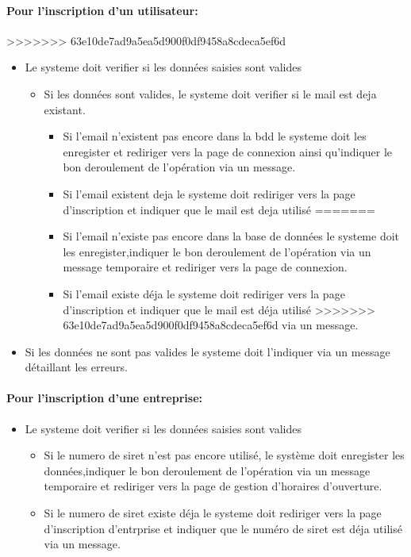 \documentclass{article}
\begin{document}
\begin{itemize}
\begin{itemize}
\paragraph{Pour l'inscription d'un utilisateur: }
>>>>>>> 63e10de7ad9a5ea5d900f0df9458a8cdeca5ef6d
\begin{itemize}
\item Le systeme doit verifier si les données saisies sont valides
	\begin{itemize}
	\item Si les données sont valides, le systeme doit verifier si le mail
		est deja existant.
		\begin{itemize}
<<<<<<< HEAD
		\item Si l'email n'existent pas encore dans la bdd le systeme
			doit les enregister et rediriger vers la page de connexion
			ainsi qu'indiquer le bon deroulement de l'opération via un message.
		\item Si l'email existent deja le systeme doit rediriger vers
			la page d'inscription et indiquer que le mail est deja utilisé
=======
		\item Si l'email n'existe pas encore dans la base de données le systeme
			doit les enregister,indiquer le bon deroulement de l'opération via un message temporaire et rediriger vers la page de connexion.
		\item Si l'email existe déja le systeme doit rediriger vers
			la page d'inscription et indiquer que le mail est déja utilisé
>>>>>>> 63e10de7ad9a5ea5d900f0df9458a8cdeca5ef6d
			via un message.
		\end{itemize}
	\end{itemize}
\item Si les données ne sont pas valides le systeme doit l'indiquer
	via un message détaillant les erreurs.
\end{itemize}

\paragraph{Pour l'inscription d'une entreprise: }
\begin{itemize}
\item Le systeme doit verifier si les données saisies sont valides
	
		\begin{itemize}
		\item Si le numero de siret n'est pas encore utilisé, le système
			doit enregister les données,indiquer le bon deroulement de l'opération via un message temporaire et rediriger vers la page de gestion d'horaires d'ouverture.
		\item Si le numero de siret existe déja le systeme doit rediriger vers
			la page d'inscription d'entrprise et indiquer que le numéro de siret est déja utilisé
			via un message.
		\end{itemize}


\end{itemize}
\end{itemize}
\end{itemize}
\end{document}
